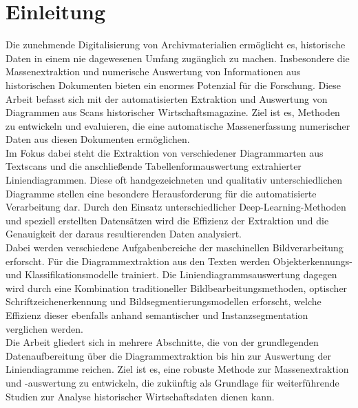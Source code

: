 \chapter{Einleitung}
\label{ch:einleitung}

Die zunehmende Digitalisierung von Archivmaterialien ermöglicht es, historische Daten in einem nie dagewesenen Umfang zugänglich zu machen. Insbesondere die Massenextraktion und numerische Auswertung von Informationen aus historischen Dokumenten bieten ein enormes Potenzial für die Forschung. Diese Arbeit befasst sich mit der automatisierten Extraktion und Auswertung von Diagrammen aus Scans historischer Wirtschaftsmagazine. Ziel ist es, Methoden zu entwickeln und evaluieren, die eine automatische Massenerfassung numerischer Daten aus diesen Dokumenten ermöglichen.
\\
Im Fokus dabei steht die Extraktion von verschiedener Diagrammarten aus Textscans und die anschließende Tabellenformauswertung extrahierter Liniendiagrammen. Diese oft handgezeichneten und qualitativ unterschiedlichen Diagramme stellen eine besondere Herausforderung für die automatisierte Verarbeitung dar. Durch den Einsatz unterschiedlicher Deep-Learning-Methoden und speziell erstellten Datensätzen wird die Effizienz der Extraktion und die Genauigkeit der daraus resultierenden Daten analysiert.
\\
Dabei werden verschiedene Aufgabenbereiche der maschinellen Bildverarbeitung erforscht. Für die Diagrammextraktion aus den Texten werden Objekterkennungs- und Klassifikationsmodelle trainiert. Die Liniendiagrammsauswertung dagegen wird durch eine Kombination traditioneller Bildbearbeitungsmethoden, optischer Schriftzeichenerkennung und Bildsegmentierungsmodellen erforscht, welche Effizienz dieser ebenfalls anhand semantischer und Instanzsegmentation verglichen werden.
\\
Die Arbeit gliedert sich in mehrere Abschnitte, die von der grundlegenden Datenaufbereitung über die Diagrammextraktion bis hin zur Auswertung der Liniendiagramme reichen. Ziel ist es, eine robuste Methode zur Massenextraktion und -auswertung zu entwickeln, die zukünftig als Grundlage für weiterführende Studien zur Analyse historischer Wirtschaftsdaten dienen kann.